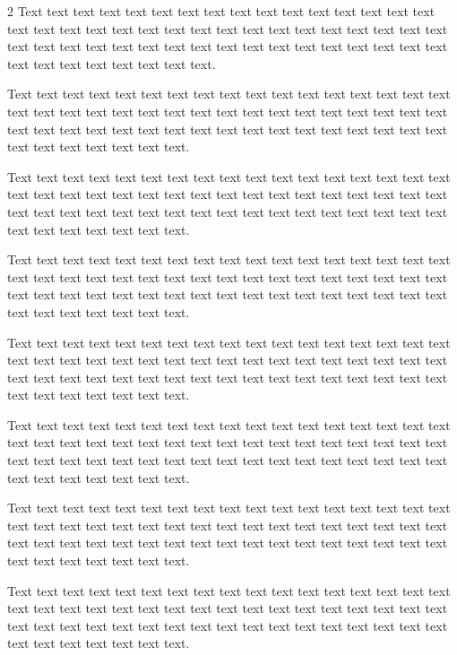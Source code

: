 \documentclass[12pt,twoside]{apa7}
\begin{document}
\begin{multicols}{2}
Text text text text text text text text text text text text text text text text text text text text text text text text text text text text text text text text text text text text text text text text text text text text text text text text text text text text text text text text text text.

Text text text text text text text text text text text text text text text text text text text text text text text text text text text text text text text text text text text text text text text text text text text text text text text text text text text text text text text text text text.

Text text text text text text text text text text text text text text text text text text text text text text text text text text text text text text text text text text text text text text text text text text text text text text text text text text text text text text text text text text.

Text text text text text text text text text text text text text text text text text text text text text text text text text text text text text text text text text text text text text text text text text text text text text text text text text text text text text text text text text text.

Text text text text text text text text text text text text text text text text text text text text text text text text text text text text text text text text text text text text text text text text text text text text text text text text text text text text text text text text text text.

Text text text text text text text text text text text text text text text text text text text text text text text text text text text text text text text text text text text text text text text text text text text text text text text text text text text text text text text text text text.

Text text text text text text text text text text text text text text text text text text text text text text text text text text text text text text text text text text text text text text text text text text text text text text text text text text text text text text text text text text.

Text text text text text text text text text text text text text text text text text text text text text text text text text text text text text text text text text text text text text text text text text text text text text text text text text text text text text text text text text text.


\end{multicols}
\end{document}
